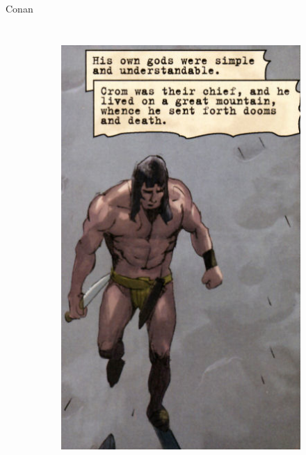 \begin{frame}{Conan}
\begin{columns}
\begin{figure}[htp]
\begin{subfigure}[b]{0.27\textwidth}
   \includegraphics[width=\textwidth]{img/conan/DH}
 \end{subfigure}
~
 \begin{subfigure}[b]{0.23\textwidth}

\end{subfigure}
\end{figure}
\end{columns}
\end{frame}
